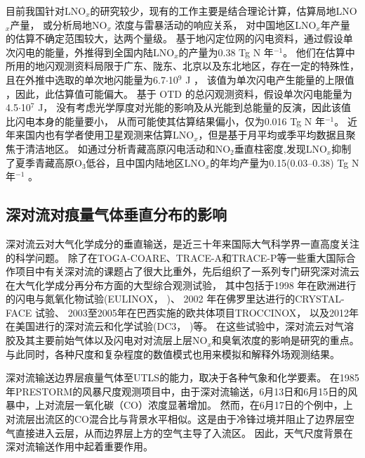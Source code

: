 目前我国针对LNO$_x$的研究较少，现有的工作主要是结合理论计算，估算局地LNO$_x$产量，
或分析局地NO$_x$ 浓度与雷暴活动的响应关系\citep{DuJian.2002,ZhangYiJun.2002,ZhouYunJun.2002}，
对中国地区LNO$_x$年产量的估算不确定范围较大，达两个量级。
\citet{ZhouYunJun.2004}基于地闪定位网的闪电资料，通过假设单次闪电的能量，外推得到全国内陆LNO$_x$的产量为0.38 Tg N 年$^{-1}$。
他们在估算中所用的地闪观测资料局限于广东、陇东、北京以及东北地区，存在一定的特殊性，
且在外推中选取的单次地闪能量为6.7$\cdot$10$^9$ J \citep{Price.1997a,Price.1997b}，
该值为单次闪电产生能量的上限值 \citep{Wang.1998}，因此，此估算值可能偏大。
\citet{SunAnPing.2004}基于 OTD 的总闪观测资料，假设单次闪电能量为4.5$\cdot$10$^7$ J，
没有考虑光学厚度对光能的影响及从光能到总能量的反演，因此该值比闪电本身的能量要小，
从而可能使其估算结果偏小，仅为0.016 Tg N 年$^{-1}$。
近年来国内也有学者使用卫星观测来估算LNO$_x$，但是基于月平均或季平均数据且聚焦于清洁地区。
如通过分析青藏高原闪电活动和NO$_2$垂直柱密度,发现LNO$_x$抑制了夏季青藏高原O$_3$低谷，且中国内陆地区LNO$_x$的年均产量为0.15(0.03--0.38) Tg N 年$^{-1}$ \citep{JuXiaoYu.2015,Guo.2017,GuoFengXia.2019,Li.2022}。


\subsection{深对流对痕量气体垂直分布的影响}

深对流云对大气化学成分的垂直输送，是近三十年来国际大气科学界一直高度关注的科学问题。
除了在TOGA-COARE\citep{Webster.1992}、TRACE-A\citep{Fishman.1996}和TRACE-P\citep{Jacob.2003}等一些重大国际合作项目中有关深对流的课题占了很大比重外，先后组织了一系列专门研究深对流云在大气化学成分再分布方面的大型综合观测试验，
其中包括于1998 年在欧洲进行的闪电与氮氧化物试验(EULINOX，\citeauthor{Holler.2000} \citeyear{Holler.2000})、
2002 年在佛罗里达进行的CRYSTAL-FACE 试验\citep{Toon.2003}、
2003至2005年在巴西实施的欧共体项目TROCCINOX\citep{Huntrieser.2008}，
以及2012年在美国进行的深对流云和化学试验(DC3，\citeauthor{Barth.2019} \citeyear{Barth.2019})等。
在这些试验中，深对流云对气溶胶及其主要前始气体以及闪电对对流层上层NO$_x$和臭氧浓度的影响是研究的重点。
与此同时，各种尺度和复杂程度的数值模式也用来模拟和解释外场观测结果。

深对流输送边界层痕量气体至UTLS的能力，取决于各种气象和化学要素。
在1985年PRESTORM的风暴尺度观测项目中，由于深对流输送，6月13日和6月15日的风暴中，上对流层一氧化碳（CO）浓度显著增加\citep{Dickerson.1987,Pickering.1989}。
然而，在6月17日的个例中，上对流层出流区的CO混合比与背景水平相似。这是由于冷锋过境并阻止了边界层空气直接进入云层，从而边界层上方的空气主导了入流区\citep{Pickering.1988}。
因此，天气尺度背景在深对流输送作用中起着重要作用。


